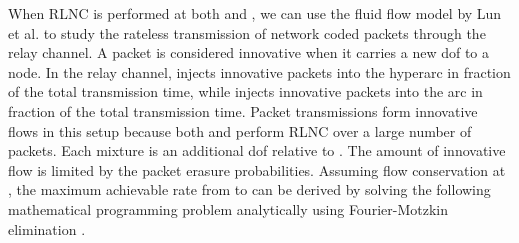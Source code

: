 \documentclass[journal, letterpaper]{IEEEtran}
\begin{document}
When RLNC is performed at both  and , we can use the fluid flow model by Lun et al. \cite{lun2008coding, traskov2008scheduling} to study the rateless transmission of network coded packets through the relay channel. A packet is considered innovative when it carries a new dof to a node. In the relay channel,  injects innovative packets into the hyperarc  in  fraction of the total transmission time, while  injects innovative packets into the arc  in  fraction of the total transmission time. Packet transmissions form innovative flows in this setup because both  and  perform RLNC over a large number of packets. Each mixture is an additional dof relative to . The amount of innovative flow is limited by the packet erasure probabilities. Assuming flow conservation at , the maximum achievable rate  from  to  can be derived by solving the following mathematical programming problem analytically using Fourier-Motzkin elimination \cite{traskovThesis}.
\end{document}
